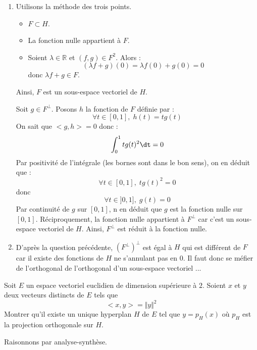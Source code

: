 \documentclass[a4paper,10pt]{report}
\begin{document}
\corr 

\begin{enumerate}
\item Utilisons la méthode des trois points.
\begin{itemize}
\item $F \subset H$.
\item La fonction nulle appartient à $F$.
\item Soient $\lambda \in \mathbb{R}$ et $(f,g) \in F^2$. Alors :
$$ (\lambda f+g)(0) = \lambda f(0)+g(0) = 0$$
donc $\lambda f+g \in F$.
\end{itemize}
Ainsi, $F$ est un sous-espace vectoriel de $H$.

\medskip

\noindent Soit $g \in F^{\perp}$. Posons $h$ la fonction de $F$ définie par :
$$ \forall t \in [0,1], \; h(t)=tg(t)$$
On sait que $<g,h>=0$ donc :
$$ \int_0^1 t g(t)^2 \dt =0$$
Par positivité de l'intégrale (les bornes sont dans le bon sens), on en déduit que :
$$ \forall t \in [0,1], \; t g(t)^2=0$$
donc 
$$ \forall t \in ]0,1], \; g(t)=0$$
Par continuité de $g$ sur $[0,1]$, n en déduit que $g$ est la fonction nulle sur $[0,1]$. Réciproquement, la fonction nulle appartient à $F^{\perp}$ car c'est un sous-espace vectoriel de $H$. Ainsi, $F^{\perp}$ est réduit à la fonction nulle.
\item D'après la question précédente, $(F^{\perp})^{\perp}$ est égal à $H$ qui est différent de $F$ car il existe des fonctions de $H$ ne s'annulant pas en $0$. Il faut donc se méfier de l'orthogonal de l'orthogonal d'un sous-espace vectoriel ...
\end{enumerate}

\begin{Exa} Soit $E$ un espace vectoriel euclidien de dimension supérieure à $2$.  Soient $x$ et $y$ deux vecteurs distincts de $E$ tels que $$< x, y> =\Vert y \Vert^{2}$$
 Montrer qu'il existe un unique hyperplan $H$ de $E$ tel que $y = p_{H}(x)$ où $p_H$ est la projection orthogonale sur $H$.
 \end{Exa}
 
 \corr Raisonnons par analyse-synthèse.
 
\end{document}
